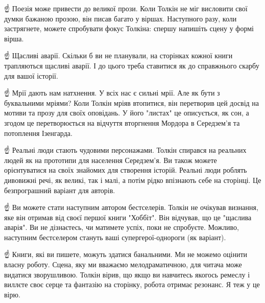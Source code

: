 ☝️ Поезія може привести до великої прози.
Коли Толкін не міг висловити свої думки бажаною прозою, він писав багато у віршах. Наступного разу, коли застрягнете, можете спробувати фокус Толкіна: спершу напишіть сцену у формі вірша.

☝️ Щасливі аварії.
Скільки б ви не планували, на сторінках кожної книги трапляються щасливі аварії. І до цього треба ставитися як до справжнього скарбу для вашої історії.

☝️ Мрії дають нам натхнення.
У всіх нас є сильні мрії. Але як бути з буквальними мріями?
Коли Толкін мріяв втопитися, він перетворив цей досвід на мотиви та прозу для своїх оповідань. У його "листах" це описується, як сон, а згодом це перетворюється на відчуття вторгнення Мордора в Середзем’я та потоплення Ізенгарда.

☝️ Реальні люди стають чудовими персонажами.
Толкін спирався на реальних людей як на прототипи для населення Середзем’я. Ви також можете орієнтуватися на своїх знайомих для створення історій. Реальні люди роблять дивовижні речі, як великі, так і малі, а потім рідко впізнають себе на сторінці. Це безпрограшний варіант для авторів.

☝️ Ви можете стати наступним автором бестселерів.
Толкін не очікував визнання, яке він отримав від своєї першої книги "Хоббіт". Він відчував, що це "щаслива аварія". Ви не дізнаєтесь, чи матимете успіх, поки не спробуєте. Можливо, наступним бестселером стануть ваші супергерої-однороги (як варіант).

☝️ Книги, які ви пишете, можуть здатися банальними.
Ми не можемо оцінити власну роботу. Сцена, яку ми вважаємо мелодраматичною, для читача може видатися зворушливою. Толкін вірив, що якщо ви навчитесь якогось ремеслу і виллєте своє серце та фантазію на сторінку, робота отримає резонанс. Я теж у це вірю.

